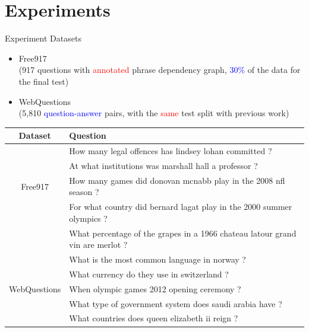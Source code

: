 \documentclass{beamer}
\begin{document}
\section{Experiments}
\begin{frame}{Experiment}
	Datasets
	\begin{itemize}
			\item Free917 \\ (917 questions with \textcolor{red}{annotated} phrase dependency graph, \textcolor{blue}{30\%} of the data for the final test) 
			\item WebQuestions \\ (5,810 \textcolor{blue}{question-answer} pairs, with the \textcolor{red}{same} test split with previous work)
	\end{itemize}
	\begin{table}[htb!]
\centering
\tiny
\begin{tabular}{|c|l|}
\hline
Dataset & Question \\
\hline
 & How many legal offences has lindsey lohan committed ?\\ \cline{2-2}
& At what institutions was marshall hall a professor ?\\ \cline{2-2}
Free917 & How many games did donovan mcnabb play in the 2008 nfl season ?\\ \cline{2-2}
& For what country did bernard lagat play in the 2000 summer olympics ? \\ \cline{2-2}
& What percentage of the grapes in a 1966 chateau latour grand vin are merlot ?\\ 
\hline
 & What is the most common language in norway ? \\ \cline{2-2}
 & What currency do they use in switzerland ?\\ \cline{2-2}
WebQuestions & When olympic games 2012 opening ceremony ?\\ \cline{2-2}
 & What type of government system does saudi arabia have ?\\ \cline{2-2}
 & What countries does queen elizabeth ii reign ? \\
\hline
\end{tabular}
\end{table}
\end{frame}
\end{document}
